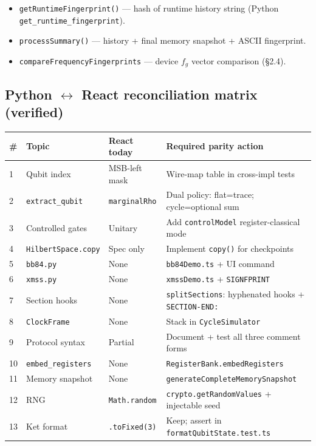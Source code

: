 \documentclass[11pt,a4paper]{article}
\begin{document}
\begin{itemize}
  \item \texttt{getRuntimeFingerprint()} --- hash of runtime history string (Python \texttt{get\_runtime\_fingerprint}).
  \item \texttt{processSummary()} --- history + final memory snapshot + ASCII fingerprint.
  \item \texttt{compareFrequencyFingerprints} --- device $f_g$ vector comparison (\S2.4).
\end{itemize}

\subsection{Python $\leftrightarrow$ React reconciliation matrix (verified)}

\begin{center}
\scriptsize
\begin{tabular}{@{}p{0.4cm}p{2.8cm}p{5.5cm}p{5.8cm}@{}}
\toprule
\# & Topic & React today & Required parity action \\
\midrule
1 & Qubit index & MSB-left mask & Wire-map table in cross-impl tests \\
2 & \texttt{extract\_qubit} & \texttt{marginalRho} & Dual policy: flat=trace; cycle=optional sum \\
3 & Controlled gates & Unitary & Add \texttt{controlModel} register-classical mode \\
4 & \texttt{HilbertSpace.copy} & Spec only & Implement \texttt{copy()} for checkpoints \\
5 & \texttt{bb84.py} & None & \texttt{bb84Demo.ts} + UI command \\
6 & \texttt{xmss.py} & None & \texttt{xmssDemo.ts} + \texttt{SIGNFPRINT} \\
7 & Section hooks & None & \texttt{splitSections}: hyphenated hooks + \texttt{SECTION-END:} \\
8 & \texttt{ClockFrame} & None & Stack in \texttt{CycleSimulator} \\
9 & Protocol syntax & Partial & Document + test all three comment forms \\
10 & \texttt{embed\_registers} & None & \texttt{RegisterBank.embedRegisters} \\
11 & Memory snapshot & None & \texttt{generateCompleteMemorySnapshot} \\
12 & RNG & \texttt{Math.random} & \texttt{crypto.getRandomValues} + injectable seed \\
13 & Ket format & \texttt{.toFixed(3)} & Keep; assert in \texttt{formatQubitState.test.ts} \\

\end{tabular}
\end{center}
\end{document}

